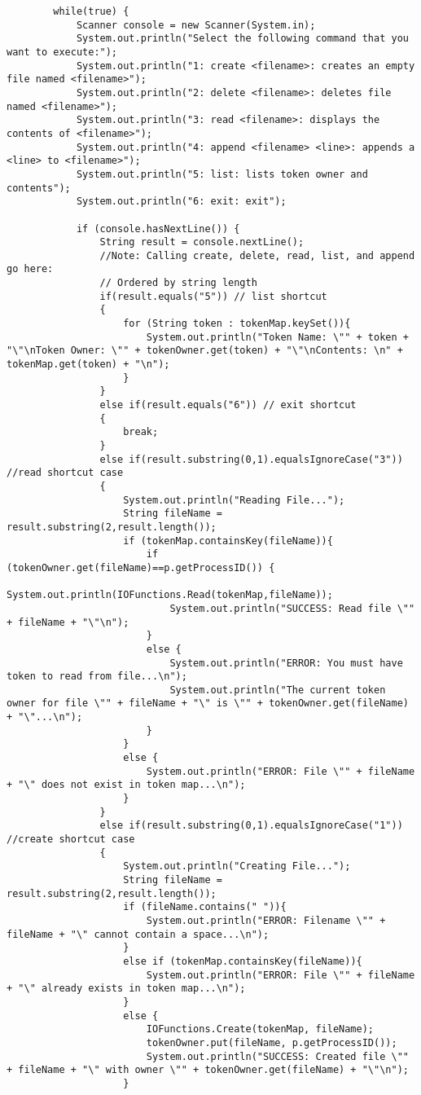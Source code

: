 \documentclass{article}
\begin{document}
\begin{lstlisting}
		while(true) {
			Scanner console = new Scanner(System.in);
			System.out.println("Select the following command that you want to execute:");
			System.out.println("1: create <filename>: creates an empty file named <filename>");
			System.out.println("2: delete <filename>: deletes file named <filename>");
			System.out.println("3: read <filename>: displays the contents of <filename>");
			System.out.println("4: append <filename> <line>: appends a <line> to <filename>");
			System.out.println("5: list: lists token owner and contents");
			System.out.println("6: exit: exit");
			
			if (console.hasNextLine()) {
				String result = console.nextLine();
				//Note: Calling create, delete, read, list, and append go here:
				// Ordered by string length
				if(result.equals("5")) // list shortcut
				{
					for (String token : tokenMap.keySet()){
						System.out.println("Token Name: \"" + token + "\"\nToken Owner: \"" + tokenOwner.get(token) + "\"\nContents: \n" + tokenMap.get(token) + "\n");
					}
				}
				else if(result.equals("6")) // exit shortcut
				{
					break;
				}
				else if(result.substring(0,1).equalsIgnoreCase("3")) //read shortcut case
				{
					System.out.println("Reading File...");
					String fileName = result.substring(2,result.length());
					if (tokenMap.containsKey(fileName)){
						if (tokenOwner.get(fileName)==p.getProcessID()) {
							System.out.println(IOFunctions.Read(tokenMap,fileName));
							System.out.println("SUCCESS: Read file \"" + fileName + "\"\n");
						}
						else {
							System.out.println("ERROR: You must have token to read from file...\n");
							System.out.println("The current token owner for file \"" + fileName + "\" is \"" + tokenOwner.get(fileName) + "\"...\n");
						}
					}
					else {
						System.out.println("ERROR: File \"" + fileName + "\" does not exist in token map...\n");
					}
				}
				else if(result.substring(0,1).equalsIgnoreCase("1")) //create shortcut case
				{
					System.out.println("Creating File...");
					String fileName = result.substring(2,result.length());
					if (fileName.contains(" ")){
						System.out.println("ERROR: Filename \"" + fileName + "\" cannot contain a space...\n");
					}
					else if (tokenMap.containsKey(fileName)){
						System.out.println("ERROR: File \"" + fileName + "\" already exists in token map...\n");
					}
					else {
						IOFunctions.Create(tokenMap, fileName);
						tokenOwner.put(fileName, p.getProcessID());
						System.out.println("SUCCESS: Created file \"" + fileName + "\" with owner \"" + tokenOwner.get(fileName) + "\"\n");
					}
					

\end{lstlisting}
\end{document}
